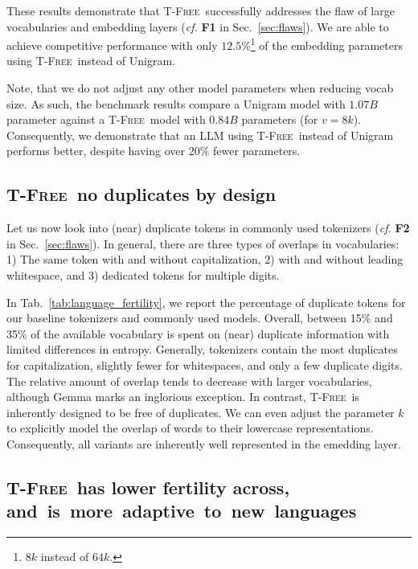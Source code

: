 \documentclass[11pt]{article}
\newcommand{\method}{\textsc{T-Free}}
\begin{document}
These results demonstrate that \method\ successfully addresses the flaw of large vocabularies and embedding layers (\emph{cf.} \textbf{F1} in Sec.~\ref{sec:flaws}).  
We are able to achieve competitive performance with only $12.5\%$\footnote{$8k$ instead of $64k$.} of the embedding parameters  using \method~instead of Unigram. 

Note, that we do not adjust any other model parameters when reducing vocab size. 
As such, the benchmark results compare a Unigram model with $1.07B$ parameter against a \method\ model with $0.84B$ parameters (for $v=8k$). 
 Consequently, we demonstrate that an LLM using \method~instead of Unigram performs better, despite having over 20\% fewer parameters.

\subsection{\method\ no duplicates by design}
\label{sec:exp_flaws}
Let us now look into (near) duplicate tokens  in commonly used tokenizers (\emph{cf.} \textbf{F2} in Sec.~\ref{sec:flaws}). In general, there are three types of overlaps in vocabularies: 1) The same token with and without capitalization, 2) with and without leading whitespace, and 3) dedicated tokens for multiple digits. 

In Tab.~\ref{tab:language_fertility}, we report the percentage of duplicate tokens for our baseline tokenizers and commonly used models. Overall, between 15\% and 35\% of the available vocabulary is spent on (near) duplicate information with limited differences in entropy. Generally, tokenizers contain the most duplicates for capitalization, slightly fewer for whitespaces, and only a few duplicate digits. The relative amount of overlap tends to decrease with larger vocabularies, although Gemma marks an inglorious exception.
In contrast, \method~is inherently designed to be free of duplicates.
We can even adjust the parameter $k$ to explicitly model the overlap of words to their lowercase representations. Consequently, all variants are inherently well represented in the emedding layer. 

\subsection{\method\ has lower fertility across, \mbox{and is more adaptive to new languages}}
\label{sec:main_results}
\end{document}
